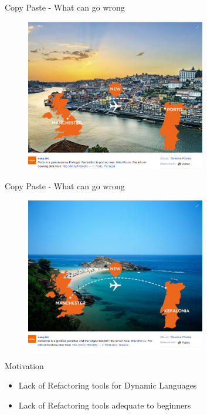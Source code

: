 \documentclass[xcolor=dvipsnames, 14pt]{beamer}
\begin{document}
\begin{frame}{Copy Paste - What can go wrong}
\begin{figure}[htbp]
  \centering
  \includegraphics[width=0.7\textwidth]{img/WhatCanGoWrongWithCopyPaste1.png}
  \label{fig:CopyPaste}
\end{figure}
\end{frame}
\begin{frame}{Copy Paste - What can go wrong}
\begin{figure}[htbp]
  \centering
  \includegraphics[width=0.7\textwidth]{img/WhatCanGoWrongWithCopyPaste.png}
  \label{fig:CopyPaste-error}
\end{figure}
\end{frame}
\begin{frame}{Motivation}
  \begin{itemize}
  \setlength\itemsep{2em}
  \item {
    Lack of Refactoring tools for Dynamic Languages
  }
  \item {
    Lack of Refactoring tools adequate to beginners
  }
  \end{itemize}
\end{frame}
\end{document}
